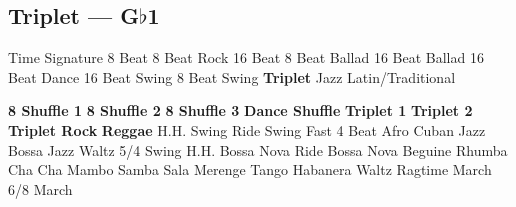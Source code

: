 \subsection{Triplet --- G$\flat$1}
Time Signature
8 Beat
8 Beat Rock
16 Beat
8 Beat Ballad
16 Beat Ballad
16 Beat Dance
16 Beat Swing
8 Beat Swing
\textbf{Triplet}
Jazz
Latin/Traditional





























\textbf{8 Shuffle 1}
\textbf{8 Shuffle 2}
\textbf{8 Shuffle 3}
\textbf{Dance Shuffle}
\textbf{Triplet 1}
\textbf{Triplet 2}
\textbf{Triplet Rock}
\textbf{Reggae}
H.H. Swing
Ride Swing
Fast 4 Beat
Afro Cuban
Jazz Bossa
Jazz Waltz
5/4 Swing
H.H. Bossa Nova
Ride Bossa Nova
Beguine
Rhumba
Cha Cha
Mambo
Samba
Sala
Merenge
Tango
Habanera
Waltz
Ragtime
March
6/8 March
